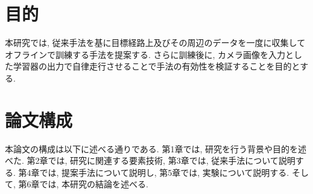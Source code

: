 




\newpage
\section{目的}
本研究では, 従来手法を基に目標経路上及びその周辺のデータを一度に収集してオフラインで訓練する手法を提案する. さらに訓練後に, カメラ画像を入力とした学習器の出力で自律走行させることで手法の有効性を検証することを目的とする. 
\section{論文構成}
本論文の構成は以下に述べる通りである. 第1章では, 研究を行う背景や目的を述べた. 第2章では, 研究に関連する要素技術, 第3章では, 従来手法について説明する. 第4章では, 提案手法について説明し, 第5章では, 実験について説明する. そして, 第6章では, 本研究の結論を述べる. 
     
